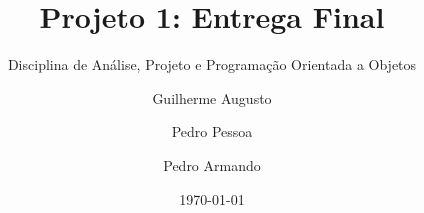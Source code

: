 \title{Projeto 1: Entrega Final}
\subtitle{Disciplina de Análise, Projeto e Programação Orientada a Objetos}
\author{Guilherme Augusto \and Pedro Pessoa \and Pedro Armando}
\date{\today}
